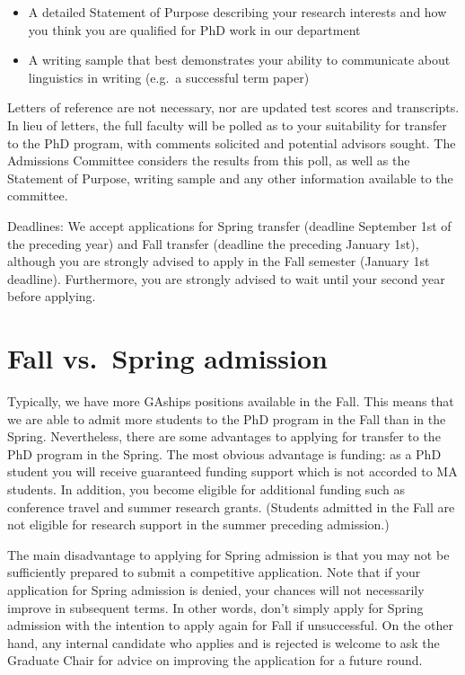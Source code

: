 \documentclass[
]{book}
\providecommand{\tightlist}{%
  \setlength{\itemsep}{0pt}\setlength{\parskip}{0pt}}
\begin{document}
\begin{itemize}
\tightlist
\item
  A detailed Statement of Purpose describing your research interests and how you think you are qualified for PhD work in our department
\item
  A writing sample that best demonstrates your ability to communicate about linguistics in writing (e.g.~a successful term paper)
\end{itemize}

Letters of reference are not necessary, nor are updated test scores and transcripts. In lieu of letters, the full faculty will be polled as to your suitability for transfer to the PhD program, with comments solicited and potential advisors sought. The Admissions Committee considers the results from this poll, as well as the Statement of Purpose, writing sample and any other information available to the committee.

Deadlines: We accept applications for Spring transfer (deadline September 1st of the preceding year) and Fall transfer (deadline the preceding January 1st), although you are strongly advised to apply in the Fall semester (January 1st deadline). Furthermore, you are strongly advised to wait until your second year before applying.

\section{Fall vs.~Spring admission}\label{fall-vs.-spring-admission}

Typically, we have more GAships positions available in the Fall. This means that we are able to admit more students to the PhD program in the Fall than in the Spring. Nevertheless, there are some advantages to applying for transfer to the PhD program in the Spring. The most obvious advantage is funding: as a PhD student you will receive guaranteed funding support which is not accorded to MA students. In addition, you become eligible for additional funding such as conference travel and summer research grants. (Students admitted in the Fall are not eligible for research support in the summer preceding admission.)

The main disadvantage to applying for Spring admission is that you may not be sufficiently prepared to submit a competitive application. Note that if your application for Spring admission is denied, your chances will not necessarily improve in subsequent terms. In other words, don't simply apply for Spring admission with the intention to apply again for Fall if unsuccessful. On the other hand, any internal candidate who applies and is rejected is welcome to ask the Graduate Chair for advice on improving the application for a future round.
\end{document}
